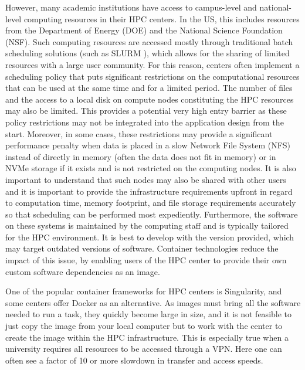 \documentclass[utf8]{FrontiersinVancouver} %
\begin{document}
However, many academic institutions have access to campus-level and
national-level computing resources in their HPC centers. In the US,  this includes
resources from the Department of Energy (DOE) and the National Science
Foundation (NSF). Such computing resources are accessed mostly through
traditional batch scheduling solutions (such as SLURM
\citep{www-slurm}), which allows for the sharing of limited resources
with a large user community. For this reason, centers often implement
a scheduling policy that puts significant restrictions on the
computational resources that can be used at the same time and for
a limited period. The number of files and the access to a local
disk on compute nodes constituting the HPC resources may also be
limited.  This provides a potential very high entry barrier as these
policy restrictions may not be integrated into the application design
from the start.  Moreover, in some cases, these restrictions may
provide a significant performance penalty when data is placed in a
slow Network File System (NFS) instead of directly in memory (often
the data does not fit in memory) or in NVMe storage if it exists and is not restricted on
the computing nodes.  It is also important to understand that such
nodes may also be shared with other users and it is important to
provide the infrastructure requirements upfront in regard to
computation time, memory footprint, and file storage requirements
accurately so that scheduling can be performed most expediently.
Furthermore, the software on these systems is maintained by the
computing staff and is typically tailored for the HPC environment.  It
is best to develop with the version provided, which may target
outdated versions of software.  Container technologies reduce the
impact of this issue, by enabling users of the HPC center to provide
their own custom software dependencies as an image.

One of the popular container frameworks for HPC centers is
Singularity, and some centers offer Docker as an alternative. As images must bring
all the software needed to run a task, they quickly become large in
size, and it is not feasible to just copy the image from your local
computer but to work with the center to create the image within the
HPC infrastructure. This is especially true when a university
requires all resources to be accessed through a VPN. Here one can
often see a factor of 10 or more slowdown in transfer and access
speeds.
\end{document}
